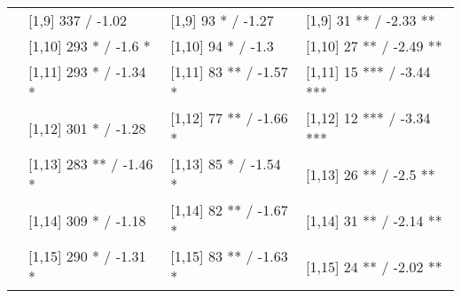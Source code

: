 \begin{table}
\begin{tabular}[t]{llll}
 & {}[1,9] 337  / -1.02 & {}[1,9] 93 * / -1.27 & {}[1,9] 31 ** / -2.33 **\\
 & {}[1,10] 293 * / -1.6 * & {}[1,10] 94 * / -1.3 & {}[1,10] 27 ** / -2.49 **\\
 & {}[1,11] 293 * / -1.34 * & {}[1,11] 83 ** / -1.57 * & {}[1,11] 15 *** / -3.44 ***\\
 & {}[1,12] 301 * / -1.28 & {}[1,12] 77 ** / -1.66 * & {}[1,12] 12 *** / -3.34 ***\\
\addlinespace
 & {}[1,13] 283 ** / -1.46 * & {}[1,13] 85 * / -1.54 * & {}[1,13] 26 ** / -2.5 **\\
 & {}[1,14] 309 * / -1.18 & {}[1,14] 82 ** / -1.67 * & {}[1,14] 31 ** / -2.14 **\\
 & {}[1,15] 290 * / -1.31 * & {}[1,15] 83 ** / -1.63 * & {}[1,15] 24 ** / -2.02 **\\
\bottomrule
\end{tabular}
\end{table}
